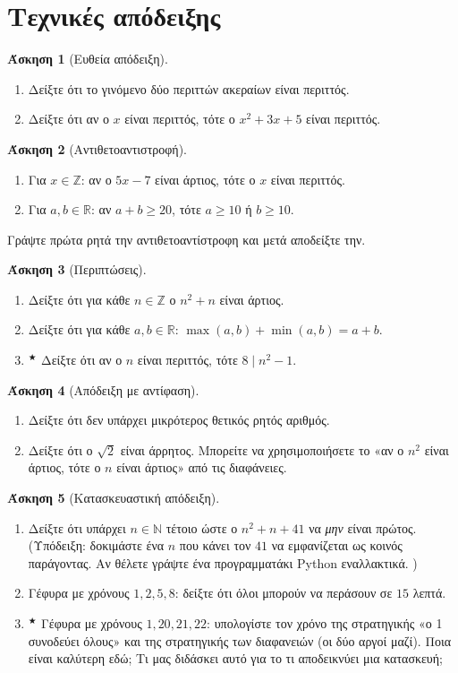 \documentclass[11pt,a4paper]{article}
\theoremstyle{definition}
\newtheorem{question}{Άσκηση}
\newcommand{\N}{\mathbb{N}}
\newcommand{\Z}{\mathbb{Z}}
\newcommand{\R}{\mathbb{R}}
\newcommand{\st}{$^{\bigstar}$}  %
\newcommand{\gi}[1]{\item[(#1)]}
\begin{document}
\section{Τεχνικές απόδειξης}

\begin{question}[Ευθεία απόδειξη]
\begin{enumerate}[itemsep=0pt]
\gi{α} Δείξτε ότι το γινόμενο δύο περιττών ακεραίων είναι περιττός.
\gi{β} Δείξτε ότι αν ο $x$ είναι περιττός, τότε ο $x^2+3x+5$ είναι περιττός.
\end{enumerate}
\end{question}


\begin{question}[Αντιθετοαντιστροφή]
\begin{enumerate}[itemsep=0pt]
\gi{α} Για $x\in\Z$: αν ο $5x-7$ είναι άρτιος, τότε ο $x$ είναι περιττός.
\gi{β} Για $a,b\in\R$: αν $a+b\ge20$, τότε $a\ge10$ ή $b\ge10$.
\end{enumerate}
Γράψτε πρώτα ρητά την αντιθετοαντίστροφη και μετά αποδείξτε την.
\end{question}


\begin{question}[Περιπτώσεις]
\begin{enumerate}[itemsep=0pt]
\gi{α} Δείξτε ότι για κάθε $n\in\Z$ ο $n^2+n$ είναι άρτιος.
\gi{β} Δείξτε ότι για κάθε $a,b\in\R$: $\max(a,b)+\min(a,b)=a+b$.
\gi{γ} \st{} Δείξτε ότι αν ο $n$ είναι περιττός, τότε $8\mid n^2-1$.
\end{enumerate}
\end{question}


\begin{question}[Απόδειξη με αντίφαση]
\begin{enumerate}[itemsep=0pt]
\gi{α} Δείξτε ότι δεν υπάρχει μικρότερος θετικός ρητός αριθμός.
\gi{β} Δείξτε ότι ο $\sqrt2$ είναι άρρητος. Μπορείτε να χρησιμοποιήσετε το
«αν ο $n^2$ είναι άρτιος, τότε ο $n$ είναι άρτιος» από τις διαφάνειες.
\end{enumerate}
\end{question}


\begin{question}[Κατασκευαστική απόδειξη]
\begin{enumerate}[itemsep=0pt]
\gi{α} Δείξτε ότι υπάρχει $n\in\N$ τέτοιο ώστε ο $n^2+n+41$ να \emph{μην} είναι πρώτος.
(Υπόδειξη: δοκιμάστε ένα $n$ που κάνει τον $41$ να εμφανίζεται ως κοινός παράγοντας. Αν θέλετε γράψτε ένα προγραμματάκι Python εναλλακτικά. )
\gi{β} Γέφυρα με χρόνους $1,2,5,8$: δείξτε ότι όλοι μπορούν να περάσουν σε $15$ λεπτά.
\gi{γ} \st{} Γέφυρα με χρόνους $1,20,21,22$: υπολογίστε τον χρόνο της στρατηγικής
«ο 1 συνοδεύει όλους» και της στρατηγικής των διαφανειών (οι δύο αργοί μαζί). Ποια είναι
καλύτερη εδώ; Τι μας διδάσκει αυτό για το τι αποδεικνύει μια κατασκευή;
\end{enumerate}
\end{question}
\end{document}
